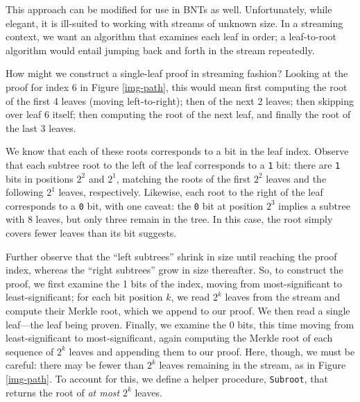 \documentclass[twocolumn]{article}
\begin{document}
This approach can be modified for use in BNTs as well. Unfortunately, while elegant, it is ill-suited to working with streams of unknown size. In a streaming context, we want an algorithm that examines each leaf in order; a leaf-to-root algorithm would entail jumping back and forth in the stream repeatedly.

How might we construct a single-leaf proof in streaming fashion? Looking at the proof for index 6 in Figure \ref{img-path}, this would mean first computing the root of the first 4 leaves (moving left-to-right); then of the next 2 leaves; then skipping over leaf 6 itself; then computing the root of the next leaf, and finally the root of the last 3 leaves.

We know that each of these roots corresponds to a bit in the leaf index. Observe that each subtree root to the left of the leaf corresponds to a \verb`1` bit: there are \verb`1` bits in positions $2^2$ and $2^1$, matching the roots of the first $2^2$ leaves and the following $2^1$ leaves, respectively. Likewise, each root to the right of the leaf corresponds to a \verb`0` bit, with one caveat: the \verb`0` bit at position $2^3$ implies a subtree with 8 leaves, but only three remain in the tree. In this case, the root simply covers fewer leaves than its bit suggests.

Further observe that the ``left subtrees'' shrink in size until reaching the proof index, whereas the ``right subtrees'' grow in size thereafter. So, to construct the proof, we first examine the 1 bits of the index, moving from most-significant to least-significant; for each bit position $k$, we read $2^k$ leaves from the stream and compute their Merkle root, which we append to our proof. We then read a single leaf---the leaf being proven. Finally, we examine the 0 bits, this time moving from least-significant to most-significant, again computing the Merkle root of each sequence of $2^k$ leaves and appending them to our proof. Here, though, we must be careful: there may be fewer than $2^k$ leaves remaining in the stream, as in Figure \ref{img-path}. To account for this, we define a helper procedure, \verb`Subroot`, that returns the root of \textit{at most} $2^k$ leaves.
\end{document}
